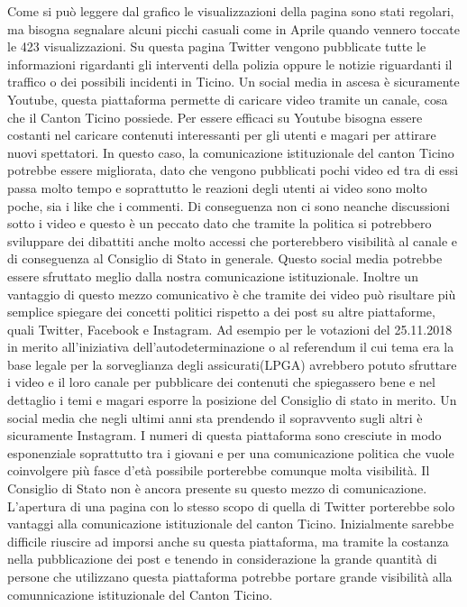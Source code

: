 Come si può leggere dal grafico le visualizzazioni della pagina sono stati regolari, ma bisogna segnalare alcuni picchi casuali come in Aprile quando vennero toccate le 423 visualizzazioni. Su questa pagina Twitter vengono pubblicate tutte le informazioni rigardanti gli interventi della polizia oppure le notizie riguardanti il traffico o dei possibili incidenti in Ticino.
Un social media in ascesa è sicuramente Youtube, questa piattaforma permette di caricare video tramite un canale, cosa che il Canton Ticino possiede. Per essere efficaci su Youtube bisogna essere costanti nel caricare contenuti interessanti per gli utenti e magari per attirare nuovi spettatori. In questo caso, la comunicazione istituzionale del canton Ticino potrebbe essere migliorata, dato che vengono pubblicati pochi video ed tra di essi passa molto tempo e soprattutto le reazioni degli utenti ai video sono molto poche, sia i like che i commenti. Di conseguenza non ci sono neanche discussioni sotto i video e questo è un peccato dato  che tramite la politica si potrebbero sviluppare dei dibattiti anche molto accessi che porterebbero visibilità al canale e di conseguenza al Consiglio di Stato in generale.  Questo social media potrebbe essere sfruttato meglio dalla nostra comunicazione istituzionale. Inoltre un vantaggio di questo mezzo comunicativo è che tramite dei video può risultare più semplice spiegare dei concetti politici rispetto a dei post su altre piattaforme, quali Twitter, Facebook e Instagram. Ad esempio per le votazioni del 25.11.2018 in merito all’iniziativa dell’autodeterminazione o al referendum il cui tema era la base legale per la sorveglianza degli assicurati(LPGA)  avrebbero potuto sfruttare i video e il loro canale per pubblicare dei contenuti che spiegassero bene e nel dettaglio i temi e magari esporre la posizione del Consiglio di stato in merito. Un social media che negli ultimi anni sta prendendo il sopravvento sugli altri è sicuramente Instagram. I numeri di questa piattaforma sono cresciute in modo esponenziale soprattutto tra i giovani e per una comunicazione politica che vuole coinvolgere più fasce d’età possibile porterebbe comunque molta visibilità. Il Consiglio di Stato non è ancora presente su questo mezzo di comunicazione. L’apertura di una pagina con lo stesso scopo di quella di Twitter porterebbe solo vantaggi alla comunicazione istituzionale del canton Ticino. Inizialmente sarebbe difficile riuscire ad imporsi anche su questa piattaforma, ma tramite la costanza nella pubblicazione dei post e tenendo in considerazione la grande quantità di persone che utilizzano questa piattaforma potrebbe portare grande visibilità alla comunnicazione istituzionale del Canton Ticino.
